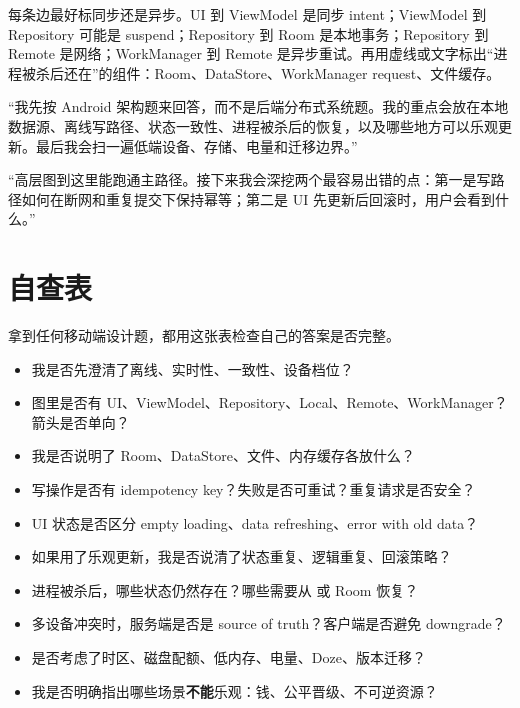每条边最好标同步还是异步。UI 到 ViewModel 是同步 intent；ViewModel 到 Repository 可能是 suspend；Repository 到 Room 是本地事务；Repository 到 Remote 是网络；WorkManager 到 Remote 是异步重试。再用虚线或文字标出“进程被杀后还在”的组件：Room、DataStore、WorkManager request、文件缓存。

\begin{sayit}[60 分钟开场话术]
“我先按 Android 架构题来回答，而不是后端分布式系统题。我的重点会放在本地数据源、离线写路径、状态一致性、进程被杀后的恢复，以及哪些地方可以乐观更新。最后我会扫一遍低端设备、存储、电量和迁移边界。”
\end{sayit}

\begin{sayit}[从高层图切到深挖]
“高层图到这里能跑通主路径。接下来我会深挖两个最容易出错的点：第一是写路径如何在断网和重复提交下保持幂等；第二是 UI 先更新后回滚时，用户会看到什么。”
\end{sayit}

\section{自查表}

拿到任何移动端设计题，都用这张表检查自己的答案是否完整。

\begin{itemize}
  \item 我是否先澄清了离线、实时性、一致性、设备档位？
  \item 图里是否有 UI、ViewModel、Repository、Local、Remote、WorkManager？箭头是否单向？
  \item 我是否说明了 Room、DataStore、文件、内存缓存各放什么？
  \item 写操作是否有 idempotency key？失败是否可重试？重复请求是否安全？
  \item UI 状态是否区分 empty loading、data refreshing、error with old data？
  \item 如果用了乐观更新，我是否说清了状态重复、逻辑重复、回滚策略？
  \item 进程被杀后，哪些状态仍然存在？哪些需要从  或 Room 恢复？
  \item 多设备冲突时，服务端是否是 source of truth？客户端是否避免 downgrade？
  \item 是否考虑了时区、磁盘配额、低内存、电量、Doze、版本迁移？
  \item 我是否明确指出哪些场景\textbf{不能}乐观：钱、公平晋级、不可逆资源？
\end{itemize}